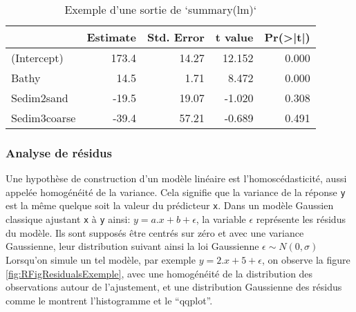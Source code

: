 \documentclass[french,a4paper]{article}
\begin{document}
\begin{table}

\caption{\label{tab:RTableSummary}Exemple d'une sortie de `summary(lm)`}
\centering
\begin{tabular}[t]{l|r|r|r|r}
\hline
  & Estimate & Std. Error & t value & Pr(>|t|)\\
\hline
(Intercept) & 173.4 & 14.27 & 12.152 & 0.000\\
\hline
Bathy & 14.5 & 1.71 & 8.472 & 0.000\\
\hline
Sedim2sand & -19.5 & 19.07 & -1.020 & 0.308\\
\hline
Sedim3coarse & -39.4 & 57.21 & -0.689 & 0.491\\
\hline
\end{tabular}
\end{table}

\subsubsection{Analyse de résidus}\label{analyse-de-residus}

Une hypothèse de construction d'un modèle linéaire est
l'homoscédasticité, aussi appelée homogénéité de la variance. Cela
signifie que la variance de la réponse \texttt{y} est la même quelque
soit la valeur du prédicteur \texttt{x}. Dans un modèle Gaussien
classique ajustant \texttt{x} à \texttt{y} ainsi:
\(y = a.x + b + \epsilon\), la variable \(\epsilon\) représente les
résidus du modèle. Ils sont supposés être centrés sur zéro et avec une
variance Gaussienne, leur distribution suivant ainsi la loi Gaussienne
\(\epsilon \sim N(0, \sigma)\)\\
Lorsqu'on simule un tel modèle, par exemple \(y = 2.x + 5 + \epsilon\),
on observe la figure \ref{fig:RFigResidualsExemple}, avec une
homogénéité de la distribution des observations autour de l'ajustement,
et une distribution Gaussienne des résidus comme le montrent
l'histogramme et le ``qqplot''.
\end{document}
